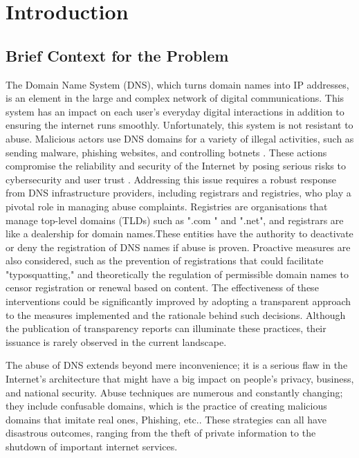 \chapter{Introduction}


\section{Brief Context for the Problem}

The Domain Name System (DNS), which turns domain names into IP addresses, is an element in the large and complex network of digital communications. This system has an impact on each user's everyday digital interactions in addition to ensuring the internet runs smoothly. Unfortunately, this system is not resistant to abuse. Malicious actors use DNS domains for a variety of illegal activities, such as sending malware, phishing websites, and controlling botnets \cite{so2022}. These actions compromise the reliability and security of the Internet by posing serious risks to cybersecurity and user trust \cite{bayer2022}. Addressing this issue requires a robust response from DNS infrastructure providers, including registrars and registries, who play a pivotal role in managing abuse complaints. Registries are organisations that manage top-level domains (TLDs) such as ".com " and ".net", and registrars are like a dealership for domain names.These entities have the authority to deactivate or deny the registration of DNS names if abuse is proven. Proactive measures are also considered, such as the prevention of registrations that could facilitate "typosquatting," and theoretically the regulation of permissible domain names to censor registration or renewal based on content. The effectiveness of these interventions could be significantly improved by adopting a transparent approach to the measures implemented and the rationale behind such decisions. Although the publication of transparency reports can illuminate these practices, their issuance is rarely observed in the current landscape.

The abuse of DNS extends beyond mere inconvenience; it is a serious flaw in the Internet's architecture that might have a big impact on people's privacy, business, and national security. Abuse techniques are numerous and constantly changing; they include confusable domains, which is the practice of creating malicious domains that imitate real ones, Phishing, etc.\cite{tatang2021}. These strategies can all have disastrous outcomes, ranging from the theft of private information to the shutdown of important internet services.

